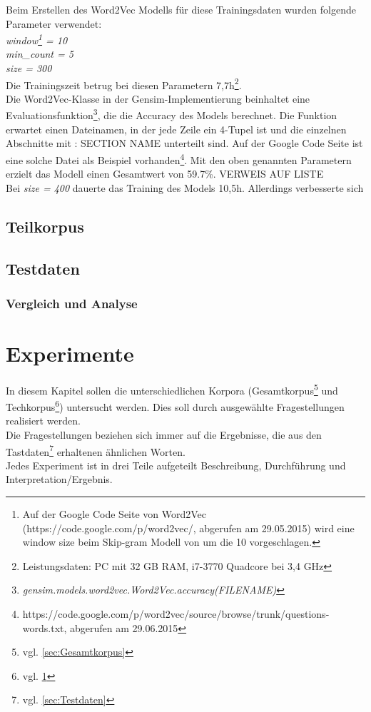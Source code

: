 \documentclass[12pt,a4paper]{report}
\begin{document}
Beim Erstellen des Word2Vec Modells für diese Trainingsdaten wurden folgende Parameter verwendet:\\
\textit{window\footnote{Auf der Google Code Seite von Word2Vec (https://code.google.com/p/word2vec/, abgerufen am 29.05.2015) wird eine window size beim Skip-gram Modell von um die 10 vorgeschlagen.} = 10}\\
\textit{min\_count = 5}\\
\textit{size = 300}\\
Die Trainingszeit betrug bei diesen Parametern 7,7h\footnote{Leistungsdaten: PC mit 32 GB RAM, i7-3770 Quadcore bei 3,4 GHz}.\\

Die Word2Vec-Klasse in der Gensim-Implementierung beinhaltet eine Evaluationsfunktion\footnote{\textit{gensim.models.word2vec.Word2Vec.accuracy(FILENAME)}}, die die Accuracy des Models berechnet. Die Funktion erwartet einen Dateinamen, in der jede Zeile ein 4-Tupel ist und die einzelnen Abschnitte mit \glqq : SECTION NAME\grqq{} unterteilt sind. Auf der Google Code Seite ist eine solche Datei als Beispiel vorhanden\footnote{https://code.google.com/p/word2vec/source/browse/trunk/questions-words.txt, abgerufen am 29.06.2015}. Mit den oben genannten Parametern erzielt das Modell einen Gesamtwert von 59.7\%. VERWEIS AUF LISTE\\
		Bei \textit{size = 400} dauerte das Training des Models 10,5h. Allerdings verbesserte sich \\
		
	
	\section{Teilkorpus}
	\label{sec:Teilkorpus}	
	
	
	\section{Testdaten}
	
	
	\subsection{Vergleich und Analyse}
\newpage
\chapter{Experimente}
In diesem Kapitel sollen die unterschiedlichen Korpora (Gesamtkorpus\footnote{vgl. \ref{sec:Gesamtkorpus}} und Techkorpus\footnote{vgl. \ref{sec:Teilkorpus}}) untersucht werden. Dies soll durch ausgewählte Fragestellungen realisiert werden.
\\Die Fragestellungen beziehen sich immer auf die Ergebnisse, die aus den Tastdaten\footnote{vgl. \ref{sec:Testdaten}} erhaltenen ähnlichen Worten.
\\Jedes Experiment ist in drei Teile aufgeteilt Beschreibung, Durchführung und Interpretation/Ergebnis.
\end{document}
